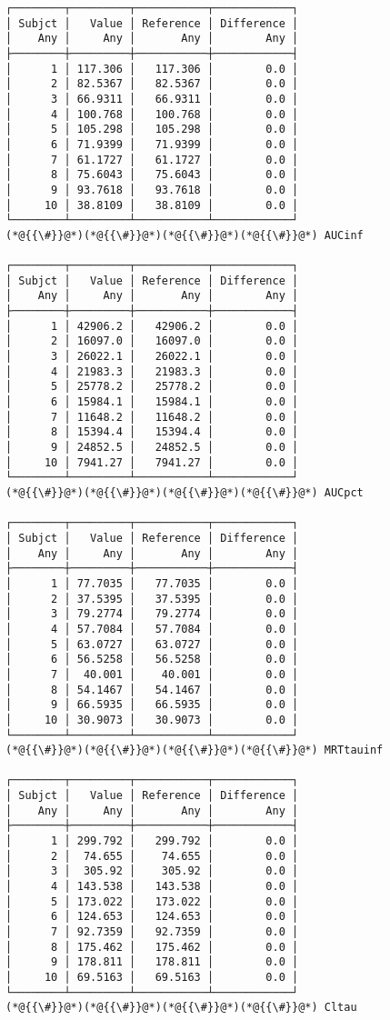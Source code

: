 \documentclass[12pt,a4paper]{article}
\begin{document}
\begin{lstlisting}
┌────────┬─────────┬───────────┬────────────┐
│ Subjct │   Value │ Reference │ Difference │
│    Any │     Any │       Any │        Any │
├────────┼─────────┼───────────┼────────────┤
│      1 │ 117.306 │   117.306 │        0.0 │
│      2 │ 82.5367 │   82.5367 │        0.0 │
│      3 │ 66.9311 │   66.9311 │        0.0 │
│      4 │ 100.768 │   100.768 │        0.0 │
│      5 │ 105.298 │   105.298 │        0.0 │
│      6 │ 71.9399 │   71.9399 │        0.0 │
│      7 │ 61.1727 │   61.1727 │        0.0 │
│      8 │ 75.6043 │   75.6043 │        0.0 │
│      9 │ 93.7618 │   93.7618 │        0.0 │
│     10 │ 38.8109 │   38.8109 │        0.0 │
└────────┴─────────┴───────────┴────────────┘
(*@{{\#}}@*)(*@{{\#}}@*)(*@{{\#}}@*)(*@{{\#}}@*) AUCinf

┌────────┬─────────┬───────────┬────────────┐
│ Subjct │   Value │ Reference │ Difference │
│    Any │     Any │       Any │        Any │
├────────┼─────────┼───────────┼────────────┤
│      1 │ 42906.2 │   42906.2 │        0.0 │
│      2 │ 16097.0 │   16097.0 │        0.0 │
│      3 │ 26022.1 │   26022.1 │        0.0 │
│      4 │ 21983.3 │   21983.3 │        0.0 │
│      5 │ 25778.2 │   25778.2 │        0.0 │
│      6 │ 15984.1 │   15984.1 │        0.0 │
│      7 │ 11648.2 │   11648.2 │        0.0 │
│      8 │ 15394.4 │   15394.4 │        0.0 │
│      9 │ 24852.5 │   24852.5 │        0.0 │
│     10 │ 7941.27 │   7941.27 │        0.0 │
└────────┴─────────┴───────────┴────────────┘
(*@{{\#}}@*)(*@{{\#}}@*)(*@{{\#}}@*)(*@{{\#}}@*) AUCpct

┌────────┬─────────┬───────────┬────────────┐
│ Subjct │   Value │ Reference │ Difference │
│    Any │     Any │       Any │        Any │
├────────┼─────────┼───────────┼────────────┤
│      1 │ 77.7035 │   77.7035 │        0.0 │
│      2 │ 37.5395 │   37.5395 │        0.0 │
│      3 │ 79.2774 │   79.2774 │        0.0 │
│      4 │ 57.7084 │   57.7084 │        0.0 │
│      5 │ 63.0727 │   63.0727 │        0.0 │
│      6 │ 56.5258 │   56.5258 │        0.0 │
│      7 │  40.001 │    40.001 │        0.0 │
│      8 │ 54.1467 │   54.1467 │        0.0 │
│      9 │ 66.5935 │   66.5935 │        0.0 │
│     10 │ 30.9073 │   30.9073 │        0.0 │
└────────┴─────────┴───────────┴────────────┘
(*@{{\#}}@*)(*@{{\#}}@*)(*@{{\#}}@*)(*@{{\#}}@*) MRTtauinf

┌────────┬─────────┬───────────┬────────────┐
│ Subjct │   Value │ Reference │ Difference │
│    Any │     Any │       Any │        Any │
├────────┼─────────┼───────────┼────────────┤
│      1 │ 299.792 │   299.792 │        0.0 │
│      2 │  74.655 │    74.655 │        0.0 │
│      3 │  305.92 │    305.92 │        0.0 │
│      4 │ 143.538 │   143.538 │        0.0 │
│      5 │ 173.022 │   173.022 │        0.0 │
│      6 │ 124.653 │   124.653 │        0.0 │
│      7 │ 92.7359 │   92.7359 │        0.0 │
│      8 │ 175.462 │   175.462 │        0.0 │
│      9 │ 178.811 │   178.811 │        0.0 │
│     10 │ 69.5163 │   69.5163 │        0.0 │
└────────┴─────────┴───────────┴────────────┘
(*@{{\#}}@*)(*@{{\#}}@*)(*@{{\#}}@*)(*@{{\#}}@*) Cltau


\end{lstlisting}
\end{document}

